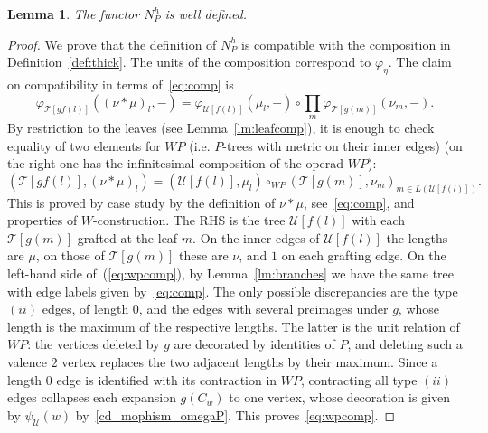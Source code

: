 \documentclass{amsart}
\newtheorem{lemma}[formula]{Lemma}
\theoremstyle{definition}
\theoremstyle{remark}
\renewcommand{\phi}{\varphi}
\begin{document}
	\begin{lemma}
		The functor $N^{h}_{P}$ is well defined.
	\end{lemma}
	\begin{proof}
		We prove that the definition of $N^{h}_{P}$ is compatible with the composition in Definition~\ref{def:thick}.
		The units of the composition correspond to $\phi_{\eta}$.
		The claim on compatibility in terms of~\eqref{eq:comp} is
		\[
		\phi_{\mathcal{T}[ gf(l)]}((\nu*\mu)_{l},-)=
		\phi_{\mathcal{U}[f(l)]}(\mu_{l},-)\circ\prod\limits_{m} \phi_{\mathcal{T}[g(m)]}(\nu_{m},-).
		\]
		By restriction to the leaves (see Lemma~\ref{lm:leafcomp}), it is enough to check equality of two elements for $WP$ (i.e. $P$-trees with metric on their inner edges) (on the right one has the infinitesimal composition of the operad $WP$):
		\begin{equation}\label{eq:wpcomp}
			(\mathcal{T}[gf(l)],(\nu*\mu)_{l})=
			(\mathcal{U}[f(l)],\mu_{l})\circ_{WP}
			(\mathcal{T}[g(m)],\nu_m{})_{m\in L(\mathcal{U}[f(l)])}.
		\end{equation}
		This is proved by case study by the definition of $\nu*\mu$, see~\eqref{eq:comp}, and properties of $W$-construction.
		The RHS is the tree $\mathcal{U}[f(l)]$ with each $\mathcal{T}[g(m)]$ grafted at the leaf $m$.
		On the inner edges of $\mathcal{U}[f(l)]$ the lengths are $\mu$, on those of $\mathcal{T}[g(m)]$ these are $\nu$, and $1$ on each grafting edge.
		On the left-hand side of~(\ref{eq:wpcomp}), by Lemma~\ref{lm:branches} we have the same tree with edge labels given by~\eqref{eq:comp}.
		The only possible discrepancies are the type $(ii)$ edges, of length $0$, and the edges with several preimages
		under $g$, whose length is the maximum of the respective lengths. 
		The latter is the unit relation of
		$W P$: the vertices deleted by $g$ are decorated by identities of $P$, and deleting
		such a valence $2$ vertex replaces the two adjacent lengths by their maximum.
		Since a length $0$ edge is identified with its contraction in $WP$, contracting all type $(ii)$ edges collapses each expansion $g(C_{w})$ to one vertex, whose decoration is given by $\psi_{\mathcal{U}}(w)$ by~\eqref{cd_mophism_omegaP}. 
		This proves~\eqref{eq:wpcomp}. 
	\end{proof}
\end{document}
